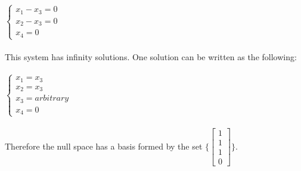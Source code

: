\documentclass[fleqn]{article}
\begin{document}
\begin{enumerate}
{        \\
        \\
        $
            \begin{cases}
              x_1-x_3=0
              \\
              x_2-x_3=0
              \\
              x_4=0
            \end{cases}
        $
        \\
        \\
        This system has infinity solutions. One solution can be written as the following:
        \\
        \\
        $
          \begin{cases}
            x_1=x_3
            \\
            x_2=x_3
            \\
            x_3=arbitrary
            \\
            x_4=0
          \end{cases}
        $
        \\
        \\
        Therefore the null space has a basis formed by the set 
        $
          \{
            \begin{bmatrix}
              1
              \\
              1
              \\
              1
              \\
              0
            \end{bmatrix}
          \} 
        $.
      }

  \end{enumerate}
\end{document}
